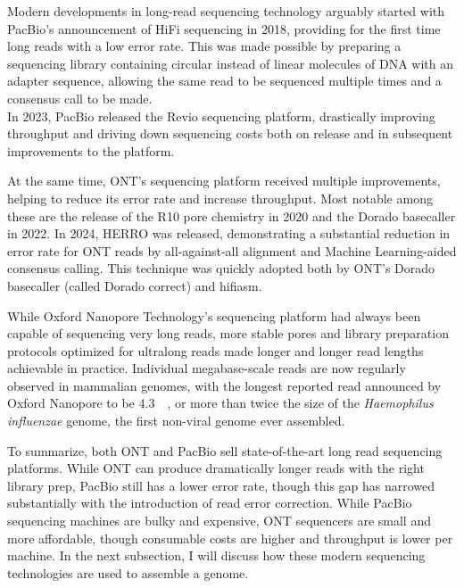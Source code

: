 Modern developments in long-read sequencing technology arguably started with PacBio's announcement of HiFi sequencing in 2018, providing for the first time long reads with a low error rate\cite{pbhifi}.
This was made possible by preparing a sequencing library containing circular instead of linear molecules of DNA with an adapter sequence, allowing the same read to be sequenced multiple times and a consensus call to be made.\\
In 2023, PacBio released the Revio sequencing platform, drastically improving throughput and driving down sequencing costs both on release and in subsequent improvements to the platform\cite{pbrevio25, pbrevio23}.

At the same time, ONT's sequencing platform received multiple improvements, helping to reduce its error rate and increase throughput\cite{wang21}.
Most notable among these are the release of the R10 pore chemistry in 2020 and the Dorado basecaller in 2022\cite{doradorelease, r10.3release, sanderson23}.
In 2024, HERRO was released, demonstrating a substantial reduction in error rate for ONT reads by all-against-all alignment and Machine Learning-aided consensus calling\cite{stanojevic24}.
This technique was quickly adopted both by ONT's Dorado basecaller (called Dorado correct) and hifiasm.

While Oxford Nanopore Technology's sequencing platform had always been capable of sequencing very long reads\cite{jain18}, more stable pores and library preparation protocols optimized for ultralong reads made longer and longer read lengths achievable in practice.
Individual megabase-scale reads are now regularly observed in mammalian genomes, with the longest reported read announced by Oxford Nanopore to be \qty{4.3}{\mega\bp}, or more than twice the size of the \textit{Haemophilus influenzae} genome, the first non-viral genome ever assembled\cite{whales, fleischmann95}.

To summarize, both ONT and PacBio sell state-of-the-art long read sequencing platforms.
While ONT can produce dramatically longer reads with the right library prep, PacBio still has a lower error rate, though this gap has narrowed substantially with the introduction of read error correction.
While PacBio sequencing machines are bulky and expensive, ONT sequencers are small and more affordable, though consumable costs are higher and throughput is lower per machine.
In the next subsection, I will discuss how these modern sequencing technologies are used to assemble a genome. 

